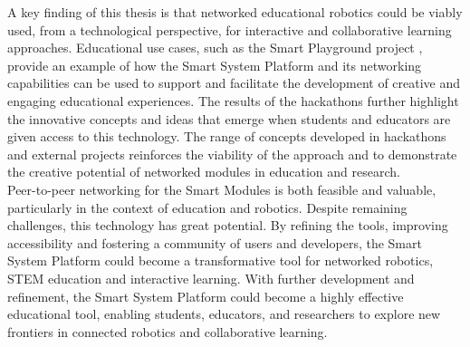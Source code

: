A key finding of this thesis is that networked educational robotics could be viably used, from a technological perspective, for interactive and collaborative learning approaches. Educational use cases, such as the Smart Playground project \citep{blake-west_smart_2025}, provide an example of how the Smart System Platform and its networking capabilities can be used to support and facilitate the development of creative and engaging educational experiences. The results of the hackathons further highlight the innovative concepts and ideas that emerge when students and educators are given access to this technology. The range of concepts developed in hackathons and external projects reinforces the viability of the approach and to demonstrate the creative potential of networked modules in education and research. \\

Peer-to-peer networking for the Smart Modules is both feasible and valuable, particularly in the context of education and robotics. Despite remaining challenges, this technology has great potential. By refining the tools, improving accessibility and fostering a community of users and developers, the Smart System Platform could become a transformative tool for networked robotics, STEM education and interactive learning.
With further development and refinement, the Smart System Platform could become a highly effective educational tool, enabling students, educators, and researchers to explore new frontiers in connected robotics and collaborative learning.






